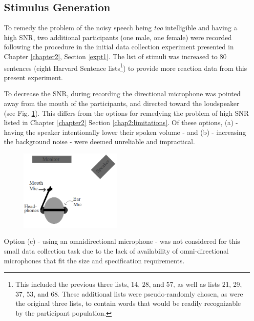 \subsection{Stimulus Generation}
\label{chap3:methods:stimuli}

To remedy the problem of the noisy speech being \textit{too} intelligible and having a high SNR, 
two additional participants (one male, one female) were recorded following the procedure in the initial data collection experiment presented in Chapter \ref{chapter2}, Section \ref{expt1}.  The list of stimuli was increased to 80 sentences (eight Harvard Sentence lists\footnote{This included the previous three lists, 14, 28, and 57, as well as lists 21, 29, 37, 53, and 68. These additional lists were pseudo-randomly chosen, as were the original three lists, to contain words that would be readily recognizable by the participant population.}) to provide more reaction data from this present experiment.  

To decrease the SNR, during recording the directional microphone was pointed away from the mouth of the participants, and directed toward the loudspeaker (see Fig. \ref{fig:overallSetUp_new}).  This differs from the options for remedying the problem of high SNR listed in Chapter \ref{chapter2} Section \ref{chap2:limitations}.  Of these options, (a) - having the speaker intentionally lower their spoken volume - and (b) - increasing the background noise - were deemed unreliable and impractical.  
\DIFaddbegin \begin{figure}
\centering
  \includegraphics[width=0.45\textwidth]{figure/overallSetUp_new.png}
  \caption{}
  \label{fig:overallSetUp_new}
\end{figure}
\DIFaddend Option (c) - using an omnidirectional microphone - was not considered for this small data collection task due to the lack of availability of omni-directional microphones that fit the size and specification requirements.

